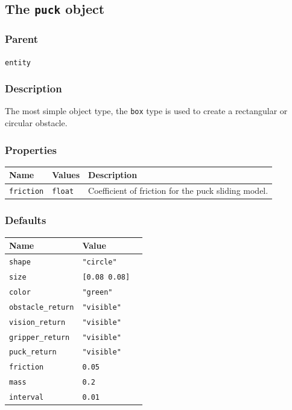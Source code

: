 \documentclass[11pt,twoside]{report}
\begin{document}
\newpage
\subsection{The {\tt puck} object}

\subsubsection*{Parent}
{\tt entity}

\subsubsection*{Description}
The most simple object type, the \verb'box' type is used to create a
rectangular or circular obstacle. 

\subsubsection*{Properties} 
\begin{tabularx}{\columnwidth}{llX}
\hline
Name & Values & Description \\
\hline
\verb'friction' & \verb'float' & Coefficient of friction for the puck sliding model.\\
\hline
\end{tabularx}


\subsubsection*{Defaults}
\begin{tabularx}{\columnwidth}{llX}
\hline
Name & Value\\
\hline
\verb'shape' & \verb'"circle"'\\
\verb'size' & \verb'[0.08 0.08]'\\
\verb'color' & \verb'"green"'\\
\verb'obstacle_return' & \verb'"visible"'\\
\verb'vision_return' & \verb'"visible"'\\
\verb'gripper_return' & \verb'"visible"'\\
\verb'puck_return' & \verb'"visible"'\\
\verb'friction' & \verb'0.05'\\
\verb'mass' & \verb'0.2'\\
\verb'interval' & \verb'0.01'\\
\hline
\end{tabularx}
\end{document}
